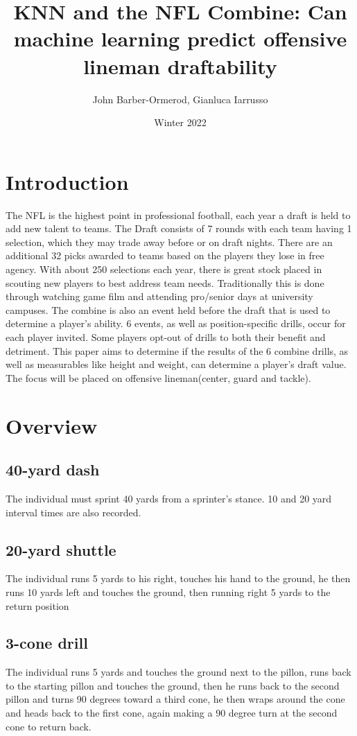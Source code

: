 \documentclass[confrence]{IEEEtran}
\title{KNN and the NFL Combine\texttrademark: Can machine learning predict offensive lineman draftability}
\author{John Barber-Ormerod, Gianluca Iarrusso}
\date{Winter 2022}
\begin{document}
\maketitle
\section*{Introduction}
The NFL is the highest point in professional football, each year a draft is held to add new talent to teams. 
The Draft consists of 7 rounds with each team having 1 selection, 
which they may trade away before or on draft nights. 
There are an additional 32 picks awarded to teams based on the players they lose in free agency. 
With about 250 selections each year, there is great stock placed in scouting new players to best address team needs. 
Traditionally this is done through watching game film and attending pro/senior days at university campuses. 
The combine is also an event held before the draft that is used to determine a player's ability. 
6 events, as well as position-specific drills, occur for each player invited. 
Some players opt-out of drills to both their benefit and detriment. 
This paper aims to determine if the results of the 6 combine drills, as well as measurables like height and weight, can determine a player's draft value. 
The focus will be placed on offensive lineman(center, guard and tackle).
\section*{Overview}
\subsection*{40-yard dash}
The individual must sprint 40 yards from a sprinter's stance. 10 and 20 yard interval times are also recorded.
\subsection*{20-yard shuttle}
The individual runs 5 yards to his right, touches his hand to the ground, he then runs 10 yards left and touches the ground, then running right 5 yards to the return position
\subsection*{3-cone drill}
The individual runs 5 yards and touches the ground next to the pillon, runs back to the starting pillon and touches the ground, then he runs back to the second pillon and turns 90 degrees toward a third cone, he then wraps around the cone and heads back to the first cone, again making a 90 degree turn at the second cone to return back. 
\end{document}
